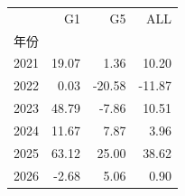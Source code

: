 \begin{tabular}{lrrr}
\toprule
 & G1 & G5 & ALL \\
年份 &  &  &  \\
\midrule
2021 & 19.07 & 1.36 & 10.20 \\
2022 & 0.03 & -20.58 & -11.87 \\
2023 & 48.79 & -7.86 & 10.51 \\
2024 & 11.67 & 7.87 & 3.96 \\
2025 & 63.12 & 25.00 & 38.62 \\
2026 & -2.68 & 5.06 & 0.90 \\
\bottomrule
\end{tabular}
